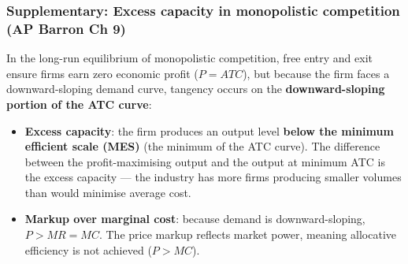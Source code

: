 \documentclass[a4paper,12pt]{article}
\newcommand{\needbold}[1]{\textcolor{red!70!black}{\textbf{#1}}}
\begin{document}
\subsubsection*{Supplementary: Excess capacity in monopolistic competition (AP Barron Ch 9)}
In the long-run equilibrium of monopolistic competition, free entry and exit ensure firms earn zero economic profit ($P = ATC$), but because the firm faces a downward-sloping demand curve, tangency occurs on the \textbf{downward-sloping portion of the ATC curve}:
\begin{itemize}
  \item \needbold{Excess capacity}: the firm produces an output level \textbf{below the minimum efficient scale (MES)} (the minimum of the ATC curve). The difference between the profit-maximising output and the output at minimum ATC is the excess capacity --- the industry has more firms producing smaller volumes than would minimise average cost.
  \item \needbold{Markup over marginal cost}: because demand is downward-sloping, $P > MR = MC$. The price markup reflects market power, meaning allocative efficiency is not achieved ($P > MC$).
\end{itemize}
\end{document}
